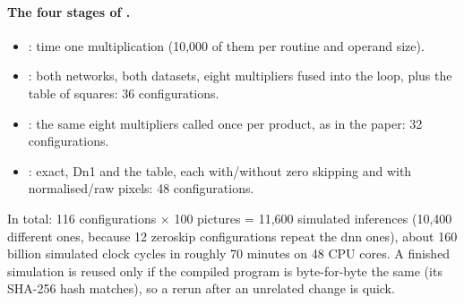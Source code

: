 \paragraph{The four stages of .}
\begin{itemize}
  \item {}: time one multiplication (10{,}000 of them per routine and operand size).
  \item {}: both networks, both datasets, eight multipliers fused into the loop, plus the
        table of squares: 36 configurations.
  \item {}: the same eight multipliers called once per product, as in the paper: 32
        configurations.
  \item {}: exact, Dn1 and the table, each with/without zero skipping and with
        normalised/raw pixels: 48 configurations.
\end{itemize}
In total: 116 configurations $\times$ 100 pictures = 11{,}600 simulated inferences (10{,}400 different
ones, because 12 zeroskip configurations repeat the dnn ones), about 160 billion simulated clock cycles in
roughly 70 minutes on 48 CPU cores. A finished simulation is reused only if the compiled program is
byte-for-byte the same (its SHA-256 hash matches), so a rerun after an unrelated change is quick.
\newpage
